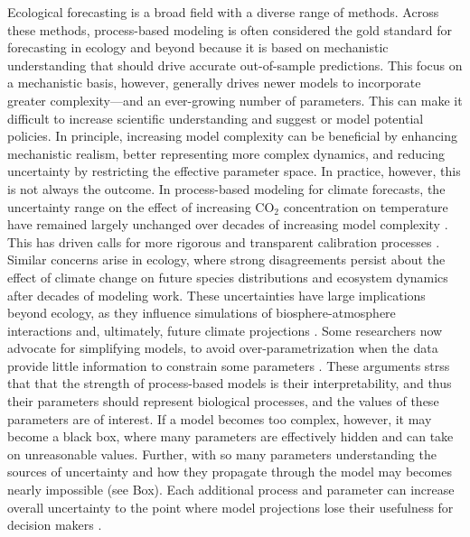 \documentclass[11pt]{article}
\newcommand{\llabel}[1]{\hypertarget{lintarget:#1}{}\linelabel{lin:#1}}
\begin{document}
Ecological forecasting is a broad field with a diverse range of methods. Across these methods, process-based modeling is often considered the gold standard for forecasting in ecology \citep{Urban2016, Pilowsky2022} and beyond because it is based on mechanistic understanding that should drive accurate out-of-sample predictions. %
This focus on a mechanistic basis, however, generally drives newer models to incorporate greater complexity---and an ever-growing number of parameters. This can make it difficult to increase scientific understanding \citep{Franklin2020} and suggest or model potential policies. 
In principle, increasing model complexity can be beneficial by enhancing mechanistic realism, better representing more complex dynamics, and \llabel{quant2}reducing uncertainty by restricting the effective parameter space. In practice, however, this is not always the outcome. In process-based modeling for climate forecasts, the uncertainty range on the effect of increasing CO$_{2}$ concentration on temperature have remained largely unchanged over decades of increasing model complexity \citep{Zelinka2020}. This has driven calls for more rigorous and transparent calibration processes \citep{balaji2022general}. Similar concerns arise in ecology, where strong disagreements persist about the effect of climate change on future species distributions \citep{Cheaib2012} and ecosystem dynamics \citep{Lovenduski2017} after decades of modeling work.
These uncertainties have large implications beyond ecology, as they influence simulations of biosphere-atmosphere interactions and, ultimately, future climate projections \citep{Bonan2018, simpson2025confronting}.
Some researchers now advocate for simplifying models, to avoid over-parametrization when the data provide little information to constrain some parameters \citep{Wang2017, Harrison2021}. These arguments strss that that the strength of process-based models is their interpretability, and thus their parameters should represent biological processes, and the values of these parameters are of interest.
If a model becomes too complex, however, it may become a black box, where many parameters are effectively hidden and can take on unreasonable values. %
Further, with so many parameters understanding the sources of uncertainty and how they propagate through the model may becomes nearly impossible (see Box).
Each additional process and parameter can increase overall uncertainty to the point where model projections lose their usefulness for decision makers \citep{Saltelli2020}. 
\end{document}
